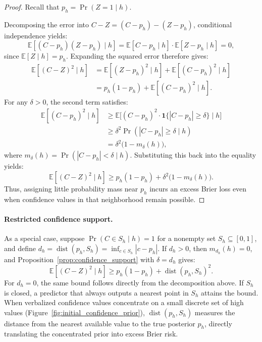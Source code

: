 \documentclass{article} %
\begin{document}
\begin{proof}
Recall that $p_h = \Pr(Z = 1 \mid h)$.

Decomposing the error into $C - Z = (C - p_h) - (Z - p_h)$, conditional independence yields:
\begin{equation}
    \mathbb E[(C - p_h)(Z - p_h) \mid h] = \mathbb E[C - p_h \mid h] \cdot \mathbb E[Z - p_h \mid h] = 0,
\end{equation}
since $\mathbb E[Z \mid h] = p_h$. Expanding the squared error therefore gives:
\begin{align}
    \mathbb E[(C - Z)^2 \mid h]
    &= \mathbb E[(Z - p_h)^2 \mid h] + \mathbb E[(C - p_h)^2 \mid h] \\
    &= p_h(1 - p_h) + \mathbb E[(C - p_h)^2 \mid h].
\end{align}
For any $\delta > 0$, the second term satisfies:
\begin{align}
    \mathbb E[(C - p_h)^2 \mid h]
    &\ge \mathbb E\bigl[(C - p_h)^2 \cdot \mathbf 1\{|C - p_h| \ge \delta\} \mid h\bigr] \\
    &\ge \delta^2 \Pr(|C - p_h| \ge \delta \mid h) \\
    &= \delta^2 \bigl(1 - m_\delta(h)\bigr),
\end{align}
where $m_\delta(h) = \Pr(|C - p_h| < \delta \mid h)$. Substituting this back into the equality yields:
\begin{equation}
    \mathbb E[(C - Z)^2 \mid h] \ge p_h(1 - p_h) + \delta^2 \bigl(1 - m_\delta(h)\bigr).
\end{equation}
Thus, assigning little probability mass near $p_h$ incurs an excess Brier loss even when confidence values in that neighborhood remain possible.
\end{proof}

\paragraph{Restricted confidence support.}
As a special case, suppose $\Pr(C \in S_h \mid h) = 1$ for a nonempty set $S_h \subseteq [0, 1]$, and define $d_h = \operatorname{dist}(p_h, S_h) = \inf_{c \in S_h} |c - p_h|$.
If $d_h > 0$, then $m_{d_h}(h) = 0$, and Proposition~\ref{prop:confidence_support} with $\delta = d_h$ gives:
\begin{equation}
    \mathbb E[(C - Z)^2 \mid h] \ge p_h(1 - p_h) + \operatorname{dist}(p_h, S_h)^2.
\end{equation}
For $d_h = 0$, the same bound follows directly from the decomposition above.
If $S_h$ is closed, a predictor that always outputs a nearest point in $S_h$ attains the bound.
When verbalized confidence values concentrate on a small discrete set of high values (Figure~\ref{fig:initial_confidence_prior}), $\operatorname{dist}(p_h, S_h)$ measures the distance from the nearest available value to the true posterior $p_h$, directly translating the concentrated prior into excess Brier risk.
\end{document}
